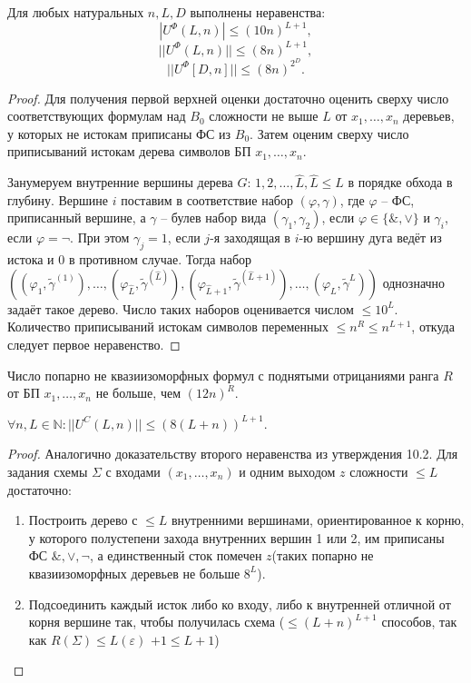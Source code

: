 \documentclass[11pt]{article}
\newcounter{th}\setcounter{th}{0}
\newcounter{cnsqnc}\setcounter{cnsqnc}{0}
\def\cnsqnc{\par\smallskip\refstepcounter{cnsqnc}\textbf{\arabic{cnsqnc}}}
\newtheorem*{Consequence}{Следствие \cnsqnc}
\newcounter{stnmt}\setcounter{stnmt}{0}
\def\st{\par\smallskip\refstepcounter{stnmt}\textbf{\arabic{stnmt}}}
\newtheorem*{Statement}{Утверждение \st}
\begin{document}
\begin{Statement}
Для любых натуральных $n, L, D$ выполнены неравенства:
\begin{equation*}
|U^{\Phi}(L, n)| \leq (10n)^{L + 1}, 
\end{equation*}
\begin{equation*}
||U^{\Phi}(L, n)|| \leq (8n)^{L + 1},
\end{equation*}
\begin{equation*}
||U^{\Phi}[D, n]|| \leq (8n)^{2^D}.
\end{equation*}
\end{Statement}
\begin{proof}
Для получения первой верхней оценки достаточно оценить сверху число соответствующих формулам
над $B_0$ сложности не выше $L$ от $x_1, \ldots, x_n$ деревьев, у которых не истокам приписаны
ФС из $B_0$. Затем оценим сверху число приписываний истокам дерева символов БП $x_1, \ldots, x_n$.

Занумеруем внутренние вершины дерева $G$: $1, 2, \ldots, \hat{L}, \hat{L} \leq L$ в порядке
обхода в глубину. Вершине $i$ поставим в соответствие набор $(\varphi, \gamma)$, где $\varphi$
-- ФС, приписанный вершине, а $\gamma$ -- булев набор вида $(\gamma_1, \gamma_2)$, если
$\varphi \in \{\&, \vee\}$ и $\gamma_i$, если $\varphi = \neg$. При этом $\gamma_j = 1$, если
$j$-я заходящая в $i$-ю вершину дуга ведёт из истока и $0$ в противном случае. Тогда набор
$((\varphi_1, \tilde{\gamma}^{(1)}), \ldots, (\varphi_{\hat{L}}, \tilde{\gamma}^{(\hat{L})}), (\varphi_{\hat{L} + 1}, \tilde{\gamma}^{(\hat{L} + 1)}), \ldots, (\varphi_L, \tilde{\gamma}^L))$
однозначно задаёт такое дерево. Число таких наборов оценивается числом $\leq 10^L$.
Количество приписываний истокам символов переменных $\leq n^R \leq n^{L + 1}$, откуда следует
первое неравенство.
\end{proof}
\begin{Consequence}
Число попарно не квазиизоморфных формул с поднятыми отрицаниями ранга $R$ от БП $x_1, \ldots, x_n$
не больше, чем $(12n)^R$.
\end{Consequence}
\begin{Statement}
$\forall n, L \in \mathbb{N}: ||U^C(L, n)|| \leq (8(L + n))^{L + 1}$.
\end{Statement}
\begin{proof}
Аналогично доказательству второго неравенства из утверждения 10.2. Для задания схемы $\Sigma$
с входами $(x_1, \ldots, x_n)$ и одним выходом $z$ сложности $\leq L$ достаточно:
\begin{enumerate}
\item Построить дерево с $\leq L$ внутренними вершинами, ориентированное к корню, у которого
полустепени захода внутренних вершин 1 или 2, им приписаны ФС $\&, \vee, \neg$, а единственный
сток помечен $z$(таких попарно не квазиизоморфных деревьев не больше $8^L$).
\item Подсоединить каждый исток либо ко входу, либо к внутренней отличной от корня вершине так,
чтобы получилась схема ($\leq (L + n)^{L + 1}$ способов, так как $R(\Sigma) \leq L(\varepsilon)$
$ + 1 \leq L + 1$)
\end{enumerate}
\end{proof}
\end{document}
